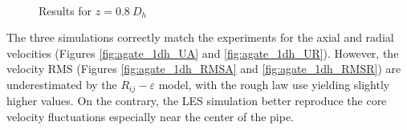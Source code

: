 \begin{figure}[!h]
\centering
{}
\\
\caption{Results for $z=0.8\ D_{h}$}
\label{fig:agate_cfd_1dh}
\end{figure}

\npar


The three simulations correctly match the experiments for the axial and radial velocities (Figures \ref{fig:agate_1dh_UA} and \ref{fig:agate_1dh_UR}). However, the velocity RMS (Figures \ref{fig:agate_1dh_RMSA} and \ref{fig:agate_1dh_RMSR}) are underestimated by the $R_{ij}-\varepsilon$ model, with the rough law use yielding slightly higher values. On the contrary, the LES simulation better reproduce the core velocity fluctuations especially near the center of the pipe.


